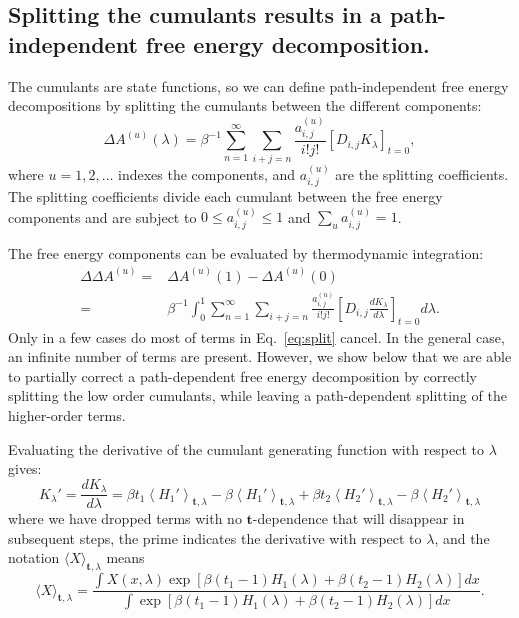 \documentclass{article}
\let\vec\mathbf
\begin{document}
\subsection{Splitting the cumulants results in a path-independent free energy decomposition.}

The cumulants are state functions, so we can define path-independent free energy decompositions by splitting the cumulants between the different components:
\begin{equation}
\Delta A^{(u)}(\lambda) =
	\beta^{-1} \sum_{n=1}^{\infty}
	\sum_{i+j=n}
	\frac{a_{i,j}^{(u)}}{i!j!}\left[ D_{i,j} K_\lambda\right]_{t=0},
\end{equation}
where $u=1, 2, \ldots$ indexes the components, and $a_{i,j}^{(u)}$ are the splitting coefficients. The splitting coefficients divide each cumulant between the free energy components and are subject to $0 \le a_{i,j}^{(u)} \le 1$ and $\sum_u a_{i,j}^{(u)}=1$.

The free energy components can be evaluated by thermodynamic integration:
\begin{align}
\Delta\Delta A^{(u)} =& \Delta A^{(u)}(1) - \Delta A^{(u)}(0) \nonumber \\
					 =&
	\beta^{-1} \int_0^1 \sum_{n=1}^{\infty}
	\sum_{i+j=n}
	\frac{a_{i,j}^{(u)}}{i!j!}
    \left[ D_{i,j} \frac{dK_\lambda}{d\lambda}\right]_{t=0} d\lambda
    \label{eq:split}.
\end{align}
Only in a few cases do most of terms in Eq.~\ref{eq:split} cancel. In the general case, an infinite number of terms are present. However, we show below that we are able to partially correct a path-dependent free energy decomposition by correctly splitting the low order cumulants, while leaving a path-dependent splitting of the higher-order terms.

Evaluating the derivative of the cumulant generating function with respect to $\lambda$ gives:
\begin{equation}
K_\lambda' = 
\frac{dK_\lambda}{d\lambda} =
	\beta t_1 \left\langle H_1' \right\rangle_{\vec t,\lambda} -
    \beta \left\langle H_1' \right\rangle_{\vec t,\lambda} +
    \beta t_2 \left\langle H_2' \right\rangle_{\vec t,\lambda} -
    \beta \left\langle H_2' \right\rangle_{\vec t,\lambda}
\end{equation}
where we have dropped terms with no $\vec t$-dependence that will disappear in subsequent steps, the prime indicates the derivative with respect to $\lambda$, and the notation $\langle X \rangle_{\vec t, \lambda}$ means
\begin{equation}
\langle X \rangle_{\vec t, \lambda}  =
	\frac
    	{\int X(x, \lambda) 
        	\exp\left[
        		\beta(t_1-1)H_1(\lambda) +
            \beta(t_2-1)H_2(\lambda)
        \right] dx
        }
    	{\int
        	\exp\left[
            \beta(t_1-1)H_1(\lambda) +
            \beta(t_2-1)H_2(\lambda)
        \right] dx
        }.
\end{equation}
\end{document}
